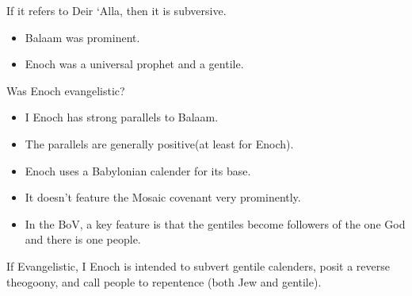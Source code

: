 \documentclass{beamer}
\begin{document}
\begin{frame}
  If it refers to Deir `Alla, then it is subversive.\pause
  \begin{itemize}
	\item Balaam was prominent.\pause
	\item Enoch was a universal prophet and a gentile.
  \end{itemize}
\end{frame}

\begin{frame}
  Was Enoch evangelistic?\pause
  \begin{itemize}
	\item I Enoch has strong parallels to Balaam.\pause
	\item The parallels are generally positive(at least for Enoch).\pause
	\item Enoch uses a Babylonian calender for its base.\pause
	\item It doesn't feature the Mosaic covenant very prominently.\pause
	\item In the BoV, a key feature is that the gentiles become followers of the one God and there is one people.
  \end{itemize}
\end{frame}

\begin{frame}
  If Evangelistic, I Enoch is intended to subvert gentile calenders, posit a reverse theogoony, and call people to repentence (both Jew and gentile).
\end{frame}
\end{document}
